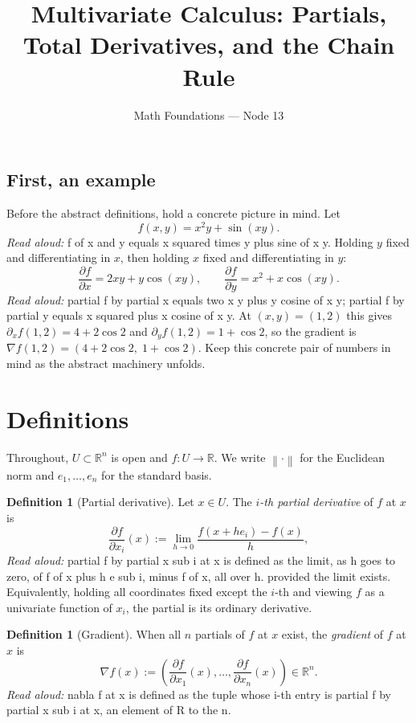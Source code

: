 \documentclass[11pt]{article}
\title{Multivariate Calculus: Partials, Total Derivatives, and the Chain Rule}
\author{Math Foundations --- Node 13}
\date{}
\theoremstyle{definition}
\newtheorem{definition}[theorem]{Definition}
\theoremstyle{remark}
\newcommand{\R}{\mathbb{R}}
\newcommand{\norm}[1]{\left\lVert #1 \right\rVert}
\newcommand{\grad}{\nabla}
\begin{document}
\maketitle

\subsection*{First, an example}
Before the abstract definitions, hold a concrete picture in mind. Let
\[
f(x,y) = x^2 y + \sin(xy).
\]
\emph{Read aloud:} f of x and y equals x squared times y plus sine of x y.
Holding $y$ fixed and differentiating in $x$, then holding $x$ fixed and differentiating in $y$:
\[
\frac{\partial f}{\partial x} = 2xy + y\cos(xy), \qquad \frac{\partial f}{\partial y} = x^2 + x\cos(xy).
\]
\emph{Read aloud:} partial f by partial x equals two x y plus y cosine of x y; partial f by partial y equals x squared plus x cosine of x y.
At $(x,y) = (1,2)$ this gives $\partial_x f(1,2) = 4 + 2\cos 2$ and $\partial_y f(1,2) = 1 + \cos 2$, so the gradient is $\grad f(1,2) = (4 + 2\cos 2,\; 1 + \cos 2)$. Keep this concrete pair of numbers in mind as the abstract machinery unfolds.

\section{Definitions}

Throughout, $U \subset \R^n$ is open and $f: U \to \R$. We write $\norm{\cdot}$ for the Euclidean norm and $e_1, \dots, e_n$ for the standard basis.

\begin{definition}[Partial derivative]
Let $x \in U$. The \emph{$i$-th partial derivative} of $f$ at $x$ is
\[
\frac{\partial f}{\partial x_i}(x) := \lim_{h \to 0} \frac{f(x + h e_i) - f(x)}{h},
\]
\emph{Read aloud:} partial f by partial x sub i at x is defined as the limit, as h goes to zero, of f of x plus h e sub i, minus f of x, all over h.
provided the limit exists. Equivalently, holding all coordinates fixed except the $i$-th and viewing $f$ as a univariate function of $x_i$, the partial is its ordinary derivative.
\end{definition}

\begin{definition}[Gradient]
When all $n$ partials of $f$ at $x$ exist, the \emph{gradient} of $f$ at $x$ is
\[
\grad f(x) := \left( \frac{\partial f}{\partial x_1}(x), \dots, \frac{\partial f}{\partial x_n}(x) \right) \in \R^n.
\]
\emph{Read aloud:} nabla f at x is defined as the tuple whose i-th entry is partial f by partial x sub i at x, an element of R to the n.
\end{definition}
\end{document}
